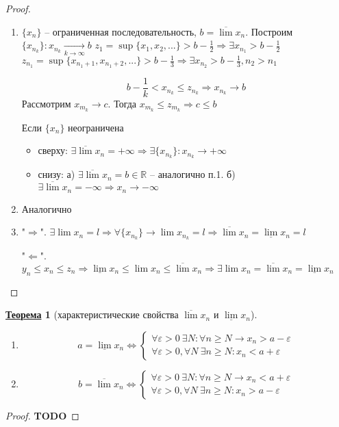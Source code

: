\documentclass[12pt]{article}
\newenvironment{MyList}[1][4pt]{
  \begin{enumerate}[1.]
  \setlength{\parskip}{0pt}
  \setlength{\itemsep}{#1}
}{       
  \end{enumerate}
}
\newenvironment{MyItemize}[1][4pt]{
  \begin{itemize}
  \setlength{\parskip}{0pt}
  \setlength{\itemsep}{#1}
}{       
  \end{itemize}
}
\def\TODO{{\color{red}\bf TODO}}
\def\R{\mathbb{R}}       %
\def\SO{\Rightarrow}     %
\def\EQ{\Leftrightarrow} %
\theoremstyle{definition} %
\newtheorem{Thm}{\underline{Теорема}}[subsection] %
\theoremstyle{plain} %
\theoremstyle{remark} %
\begin{document}
\begin{proof}
    \begin{MyList}
        \item $\{x_n\}$ -- ограниченная последовательность, $b = \overline{\lim} x_n$. Построим $\{x_{n_k}\} : x_{n_k} \xrightarrow[k \to \infty]{} b$
        $z_1 = \sup \{x_1, x_2, ...\} > b - \frac{1}{2} \SO \exists x_{n_1} > b - \frac{1}{2}$ \\
        $z_{n_1} = \sup \{x_{n_1 + 1}, x_{n_1 + 2}, ...\} > b - \frac{1}{3} \SO \exists x_{n_2} > b - \frac{1}{3}, n_2 > n_1$  
        
        \[b - \frac{1}{k} < x_{n_k} \leqslant z_{n_k} \SO x_{n_k} \to b\]
        Рассмотрим $x_{m_k} \to c$. Тогда $x_{m_k} \leqslant z_{m_k} \SO c \leqslant b$
        
        Если $\{x_n\}$ неограничена 
        \begin{MyItemize}
            \item сверху: $\exists \overline{\lim}x_n = +\infty \SO \exists \{x_{n_k}\} : x_{n_k} \to +\infty$
            \item снизу: а) $\exists \overline{\lim} x_n = b \in \R$ -- аналогично п.1. б) $\exists \overline{\lim}x_n = -\infty \SO x_n \to -\infty$   
        \end{MyItemize} 

        \item Аналогично
        \item "$\SO$". $\exists \lim x_n = l \SO \forall \{x_{n_k}\} \to \lim x_{n_k} = l \SO \overline{\lim} x_n = \underline{\lim} x_n = l$
        
        "$\Leftarrow$". $y_n \leqslant x_n \leqslant z_n \SO \underline{\lim}x_n \leqslant \lim x_n \leqslant \overline{\lim} x_n \SO \exists \lim x_n = \overline{\lim} x_n = \underline{\lim} x_n$ 
    \end{MyList}
\end{proof}

\begin{Thm}[характеристические свойства $\overline{\lim}x_n$ и $\underline{\lim} x_n$]
    \begin{MyList}
        \item \[a = \underline{\lim} x_n \EQ \begin{cases}
            \forall \varepsilon > 0 \ \exists N : \forall n \geqslant N \to x_n > a - \varepsilon \\
            \forall \varepsilon > 0, \forall N \ \exists n \geqslant N : x_n < a + \varepsilon
        \end{cases}\] 

        \item \[b = \overline{\lim} x_n \EQ \begin{cases}
            \forall \varepsilon > 0 \ \exists N : \forall n \geqslant N \to x_n < a + \varepsilon \\
            \forall \varepsilon > 0, \forall N \ \exists n \geqslant N : x_n > a - \varepsilon
        \end{cases}\]
    \end{MyList}
\end{Thm}

\begin{proof}
    \TODO
\end{proof}
\end{document}

